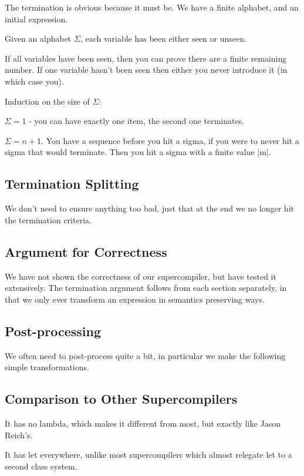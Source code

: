 \documentclass{sigplanconf}
\begin{document}
The termination is obvious because it must be. We have a finite alphabet, and an initial expression.

Given an alphabet $\Sigma$, each variable has been either seen or unseen.

If all variables have been seen, then you can prove there are a finite remaining number. If one variable hasn't been seen then either you never introduce it (in which case you).

Induction on the size of $\Sigma$:

$\Sigma = 1$ - you can have exactly one item, the second one terminates.

$\Sigma = n+1$. You have a sequence before you hit a sigma, if you were to never hit a sigma that would terminate. Then you hit a sigma with a finite value |m|.

\subsection{Termination Splitting}
\label{sec:term_split}

We don't need to ensure anything too bad, just that at the end we no longer hit the termination criteria.


\subsection{Argument for Correctness}

We have not shown the correctness of our supercompiler, but have tested it extensively. The termination argument follows from each section separately, in that we only ever transform an expression in semantics preserving ways.

\subsection{Post-processing}

We often need to post-process quite a bit, in particular we make the following simple transformations.

\subsection{Comparison to Other Supercompilers}

It has no lambda, which makes it different from most, but exactly like Jason Reich's.

It has let everywhere, unlike most supercompilers which almost relegate let to a second class system.
\end{document}
